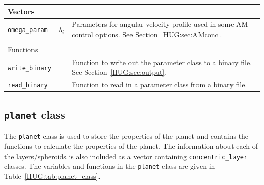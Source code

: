 \documentclass[11pt, oneside]{article}   	%
\begin{document}
\begin{longtable}{l l p{10cm}}
\multicolumn{3}{l}{Vectors} \\
\hline
\texttt{omega\_param} & $\lambda_i$ & Parameters for angular velocity profile used in some AM control options. See Section~\ref{HUG:sec:AMconc}. \\

\multicolumn{3}{l}{} \\
\multicolumn{3}{l}{Functions} \\
\hline
\texttt{write\_binary} & & Function to write out the parameter class to a binary file. See Section~\ref{HUG:sec:output}.\\
\texttt{read\_binary} & & Function to read in a parameter class from a binary file. \\

\end{longtable}
\vspace{0.5 cm}


\subsection{\texttt{planet} class}
\label{HUG:sec:planet_class}

The \texttt{planet} class is used to store the properties of the planet and contains the functions to calculate the properties of the planet.
The information about each of the layers/spheroids is also included as a vector containing \texttt{concentric\_layer} classes.
The variables and functions in the \texttt{planet} class are given in Table~\ref{HUG:tab:planet_class}.
\end{document}
